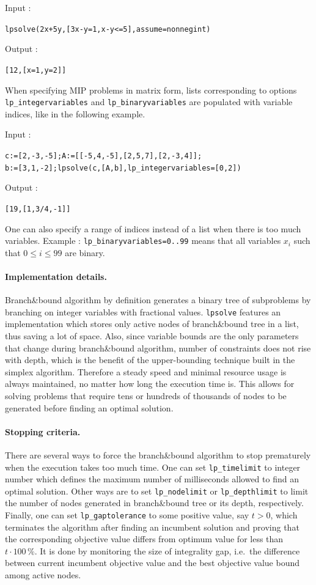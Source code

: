\documentclass[a4paper,11pt]{book}
\begin{document}
\noindent Input :
\begin{center}
{\tt lpsolve(2x+5y,[3x-y=1,x-y<=5],assume=nonnegint)}
\end{center}
Output :
\begin{center}
{\tt [12,[x=1,y=2]]}
\end{center}

When specifying MIP problems in matrix form, lists corresponding to options {\tt lp\_integervariables} and {\tt lp\_binaryvariables} are populated with variable indices, like in the following example. 

\noindent Input :
\begin{center}
	{\tt c:=[2,-3,-5];A:=[[-5,4,-5],[2,5,7],[2,-3,4]];}\\
	{\tt b:=[3,1,-2];lpsolve(c,[A,b],lp\_integervariables=[0,2])}
\end{center}
Output :
\begin{center}
	{\tt [19,[1,3/4,-1]]}
\end{center}
One can also specify a range of indices instead of a list when there is too much variables. Example : {\tt lp\_binaryvariables=0..99} means that all variables $ x_i $ such that $ 0\leq i\leq 99 $ are binary.

\paragraph{Implementation details.}
Branch\&bound algorithm by definition generates a binary tree of subproblems by branching on integer variables with fractional values. {\tt lpsolve} features an implementation which stores only active nodes of branch\&bound tree in a list, thus saving a lot of space. Also, since variable bounds are the only parameters that change during branch\&bound algorithm, number of constraints does not rise with depth, which is the benefit of the upper-bounding technique built in the simplex algorithm. Therefore a steady speed and minimal resource usage is always maintained, no matter how long the execution time is. This allows for solving problems that require tens or hundreds of thousands of nodes to be generated before finding an optimal solution.

\paragraph{Stopping criteria.}
There are several ways to force the branch\&bound algorithm to stop prematurely when the execution takes too much time. One can set {\tt lp\_timelimit} to integer number which defines the maximum number of milliseconds allowed to find an optimal solution. Other ways are to set {\tt lp\_nodelimit} or {\tt lp\_depthlimit} to limit the number of nodes generated in branch\&bound tree or its depth, respectively. Finally, one can set {\tt lp\_gaptolerance} to some positive value, say $ t>0 $, which terminates the algorithm after finding an incumbent solution and proving that the corresponding objective value differs from optimum value for less than $ t\cdot 100\,\% $. It is done by monitoring the size of integrality gap, i.e.~the difference between current incumbent objective value and the best objective value bound among active nodes.
\end{document}
